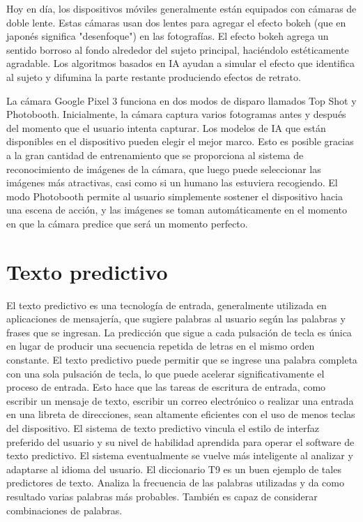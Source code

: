 Hoy en día, los dispositivos móviles generalmente están equipados con cámaras de doble lente. Estas cámaras usan dos lentes para agregar el efecto bokeh (que en japonés significa "desenfoque") en las fotografías. El efecto bokeh agrega un sentido borroso al fondo alrededor del sujeto principal, haciéndolo estéticamente agradable. Los algoritmos basados en IA ayudan a simular el efecto que identifica al sujeto y difumina la parte restante produciendo efectos de retrato.

La cámara Google Pixel 3 funciona en dos modos de disparo llamados Top Shot y Photobooth. Inicialmente, la cámara captura varios fotogramas antes y después del momento que el usuario intenta capturar. Los modelos de IA que están disponibles en el dispositivo pueden elegir el mejor marco. Esto es posible gracias a la gran cantidad de entrenamiento que se proporciona al sistema de reconocimiento de imágenes de la cámara, que luego puede seleccionar las imágenes más atractivas, casi como si un humano las estuviera recogiendo. El modo Photobooth permite al usuario simplemente sostener el dispositivo hacia una escena de acción, y las imágenes se toman automáticamente en el momento en que la cámara predice que será un momento perfecto.

\section{Texto predictivo}

El texto predictivo es una tecnología de entrada, generalmente utilizada en aplicaciones de mensajería, que sugiere palabras al usuario según las palabras y frases que se ingresan. La predicción que sigue a cada pulsación de tecla es única en lugar de producir una secuencia repetida de letras en el mismo orden constante. El texto predictivo puede permitir que se ingrese una palabra completa con una sola pulsación de tecla, lo que puede acelerar significativamente el proceso de entrada. Esto hace que las tareas de escritura de entrada, como escribir un mensaje de texto, escribir un correo electrónico o realizar una entrada en una libreta de direcciones, sean altamente eficientes con el uso de menos teclas del dispositivo. El sistema de texto predictivo vincula el estilo de interfaz preferido del usuario y su nivel de habilidad aprendida para operar el software de texto predictivo. El sistema eventualmente se vuelve más inteligente al analizar y adaptarse al idioma del usuario. El diccionario T9 es un buen ejemplo de tales predictores de texto. Analiza la frecuencia de las palabras utilizadas y da como resultado varias palabras más probables. También es capaz de considerar combinaciones de palabras.

